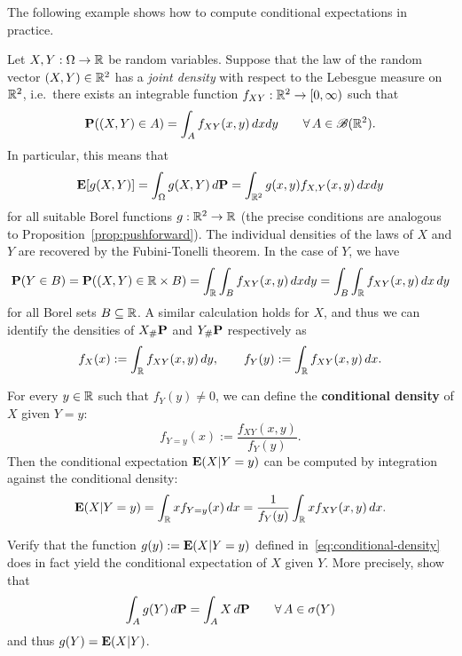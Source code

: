 The following example shows how to compute conditional expectations in practice.
\begin{example}
Let $X,Y:\Omega\to\mathbb{R}$ be random variables. Suppose that the law of the random vector $(X,Y)\in\mathbb{R}^2$ has a \emph{joint density} with respect to the Lebesgue measure on $\mathbb{R}^2$, i.e.\ there exists an integrable function $f_{XY}:\mathbb{R}^2\to [0, \infty)$ such that
\begin{equation*}
    \mathbf{P}((X,Y)\in A) = \int_A f_{XY}(x,y)\,dxdy \qquad\forall\, A\in\mathscr{B}(\mathbb{R}^2).
\end{equation*}
In particular, this means that
\begin{equation*}
    \mathbf{E}[g(X,Y)] = \int_\Omega g(X,Y)\,d\mathbf{P} = \int_{\mathbb{R}^2} g(x,y)f_{X,Y}(x,y)\,dxdy
\end{equation*}
for all suitable Borel functions $g:\mathbb{R}^2\to\mathbb{R}$ (the precise conditions are analogous to Proposition~\ref{prop:pushforward}). The individual densities of the laws of $X$ and $Y$ are recovered by the Fubini-Tonelli theorem. In the case of $Y$, we have
\begin{equation*}
    \mathbf{P}(Y\in B) = \mathbf{P}((X,Y)\in \mathbb{R}\times B) = \int_{\mathbb{R}}\int_B f_{XY}(x,y)\,dxdy = \int_B \int_{\mathbb{R}} f_{XY}(x,y)\,dx\,dy
\end{equation*}
for all Borel sets $B\subseteq\mathbb{R}$. A similar calculation holds for $X$, and thus we can identify the densities of $X_\#\mathbf{P}$ and $Y_\# \mathbf{P}$ respectively as
\begin{equation*}
    f_X(x) := \int_{\mathbb{R}} f_{XY}(x,y)\,dy, \qquad f_Y(y) := \int_{\mathbb{R}} f_{XY}(x,y)\,dx.
\end{equation*}

For every $y\in\mathbb{R}$ such that $f_Y(y)\ne 0$, we can define the \textbf{conditional density} of $X$ given $Y=y$:
\begin{equation*}
    f_{Y=y}(x) := \frac{f_{XY}(x,y)}{f_Y(y)}.
\end{equation*}
Then the conditional expectation $\mathbf{E}(X|Y=y)$ can be computed by integration against the conditional density:
\begin{equation}
\label{eq:conditional-density}
    \mathbf{E}(X|Y=y) = \int_{\mathbb{R}} x f_{Y=y}(x)\,dx = \frac{1}{f_Y(y)}\int_{\mathbb{R}} xf_{XY}(x,y)\,dx.
\end{equation}
\end{example}

\begin{exercise}
    Verify that the function $g(y):=\mathbf{E}(X|Y=y)$ defined in~\eqref{eq:conditional-density} does in fact yield the conditional expectation of $X$ given $Y$. More precisely, show that
    \begin{equation*}
        \int_A g(Y)\,d\mathbf{P} = \int_A X\,d\mathbf{P} \qquad\forall\,A\in\sigma(Y)
    \end{equation*}
    and thus $g(Y)=\mathbf{E}(X|Y)$.
\end{exercise}

